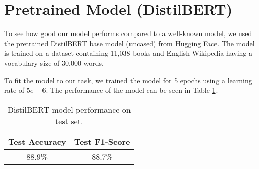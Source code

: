 \section{Pretrained Model (DistilBERT)}
To see how good our model performs compared to a well-known model, we used the pretrained DistilBERT base model (uncased) from Hugging Face. The model is trained on a dataset containing 11,038 books and English Wikipedia having a vocabulary size of 30,000 words.

To fit the model to our task, we trained the model for 5 epochs using a learning rate of $5e-6$. The performance of the model can be seen in Table \ref{tab:distilbert_model}.
\begin{table}[H]
    \vspace*{-0.5cm}
    \centering
    \begin{tabular}{|c|c|}
    \hline
    Test Accuracy & Test F1-Score \\ \hline
    88.9\% & 88.7\% \\ \hline
    \end{tabular}
    \caption{DistilBERT model performance on test set.}
    \label{tab:distilbert_model}
    \vspace*{-0.8cm}
\end{table}
